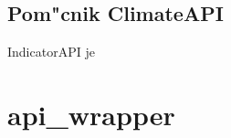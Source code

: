 % 
% 
% 
% 
% 
% 


\subsection{Pom"cnik ClimateAPI}

IndicatorAPI je 


% 
% 



\section{api\_wrapper}





